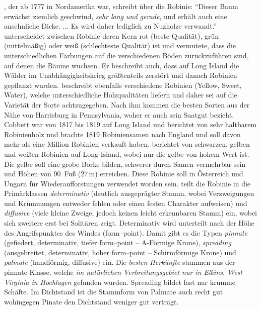 \documentclass[twocolumn]{scrartcl}
\begin{document}
\citet[S.~67]{wangenheim1781nordamericanischeHolzarten}, der ab 1777
in Nordamerika war, schreibt über die Robinie: \enquote{Dieser Baum
erwächst ziemlich geschwind, \emph{sehr lang und gerade}, und erhält
auch eine ansehnliche Dicke. ... Es wird daher lediglich zu Nuzholze
verwandt.} \citet[S.~249]{Michaux1813arbres} unterscheidet
zwischen Robinie deren Kern rot (beste Qualität), grün (mittelmäßig)
oder weiß (schlechteste Qualität) ist und vermutete, dass die unterschiedlichen
Färbungen auf die verschiedenen Böden zurückzuführen sind, auf denen die Bäume wuchsen.
Er beschreibt auch, dass auf Long
Island die Wälder im Unabhängigkeitskrieg größtenteils zerstört und
danach Robinien gepflanzt wurden. \citet{cobbett1825woodlands}
beschreibt ebenfalls verschiedene Robinien (Yellow, Sweet, Water),
welche unterschiedliche Holzqualitäten liefern und daher sei auf die
Varietät der Sorte achtzugegeben. Nach ihm kommen die besten
Sorten aus der Nähe von Harrisburg in Pennsylvania, woher er auch
sein Saatgut bezieht. Cobbett war von 1817 bis 1819 auf Long Island
und berichtet von sehr haltbarem Robinienholz und brachte 1819
Robiniensamen nach England und soll davon mehr als eine Million
Robinien verkauft haben. \citet{hicks1883robinie} berichtet von
schwarzen, gelben und weißen Robinien auf Long Island, wobei nur die
gelbe von hohem Wert ist. Die gelbe soll eine grobe Borke bilden,
schwerer durch Samen vermehrbar sein und Höhen von 90~Fuß (27\,m)
erreichen. Diese Robinie soll in Österreich und Ungarn für
Wiederaufforstungen verwendet worden sein. \citet{hopp1941robinie} teilt
die Robinie in die Primärklassen \emph{determinativ} (deutlich ausgeprägter
Stamm, wobei Verzweigungen und Krümmungen entweder fehlen oder
einen festen Charakter aufweisen) und \emph{diffusive} (viele kleine Zweige,
jedoch keinen leicht erkennbaren Stamm) ein, wobei sich zweitere erst
bei Solitären zeigt. Determinativ wird unterteilt nach der Höhe des
Angrifspunktes des Windes (form--point). Damit gibt es die Typen
\emph{pinnate} (gefiedert, determinativ, tiefer form--point --
A-Förmige Krone), \emph{spreading} (ausgebreitet, determinativ, hoher
form--point -- Schirmförmige Krone) und \emph{palmate} (handförmig,
diffusive) ein. Die \emph{besten Herkünfte} stammen aus der pinnate Klasse,
welche \emph{im natürlichen Verbreitungsgebiet nur in Elkins, West Virginia
in Hochlagen} gefunden wurden. Spreading bildet fast nur krumme
Schäfte. Im Dichtstand ist die Stammform von Palmate auch recht gut
wohingegen Pinate den Dichtstand weniger gut verträgt.
\end{document}
